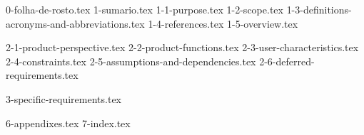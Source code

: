 \documentclass[12pt,nodisplayskipstretch]{article}
\begin{document}
{0-folha-de-rosto.tex}
{1-sumario.tex}
{1-1-purpose.tex}
{1-2-scope.tex}
{1-3-definitions-acronyms-and-abbreviations.tex}
{1-4-references.tex}
{1-5-overview.tex}

{2-1-product-perspective.tex}
{2-2-product-functions.tex}
{2-3-user-characteristics.tex}
{2-4-constraints.tex}
{2-5-assumptions-and-dependencies.tex}
{2-6-deferred-requirements.tex}

{3-specific-requirements.tex}


{6-appendixes.tex}
{7-index.tex}

\printglossaries
\end{document}
